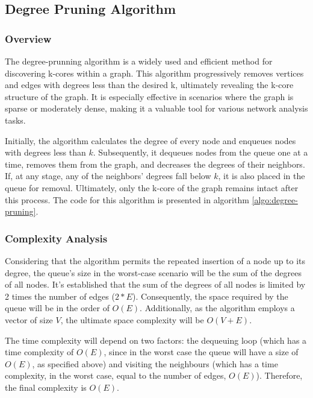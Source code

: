 \label{Algorithms}

\subsection{Degree Pruning Algorithm}

\subsubsection{Overview}

The degree-prunning algorithm is a widely used and efficient method for discovering k-cores within a graph. This algorithm progressively removes vertices and edges with degrees less than the desired k, ultimately revealing the k-core structure of the graph. It is especially effective in scenarios where the graph is sparse or moderately dense, making it a valuable tool for various network analysis tasks. 

Initially, the algorithm calculates the degree of every node and enqueues nodes with degrees less than $k$. Subsequently, it dequeues nodes from the queue one at a time, removes them from the graph, and decreases the degrees of their neighbors. If, at any stage, any of the neighbors' degrees fall below $k$, it is also placed in the queue for removal. Ultimately, only the k-core of the graph remains intact after this process. The code for this algorithm is presented in algorithm \ref{algo:degree-pruning}.



\subsubsection{Complexity Analysis}

Considering that the algorithm permits the repeated insertion of a node up to its degree, the queue's size in the worst-case scenario will be the sum of the degrees of all nodes. It's established that the sum of the degrees of all nodes is limited by 2 times the number of edges ($2*E$). Consequently, the space required by the queue will be in the order of $O(E)$. Additionally, as the algorithm employs a vector of size $V$, the ultimate space complexity will be $O(V + E)$.

The time complexity will depend on two factors: the dequeuing loop (which has a time complexity of $O(E)$, since in the worst case the queue will have a size of $O(E)$, as specified above) and visiting the neighbours (which has a time complexity, in the worst case, equal to the number of edges, $O(E)$). Therefore, the final complexity is $O(E)$.

